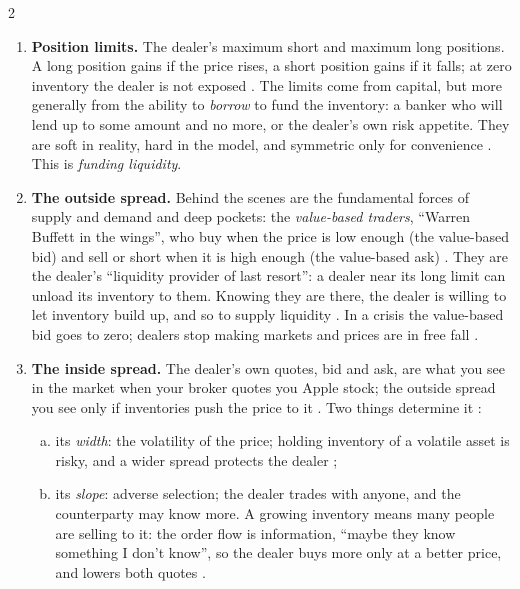 \begin{paracol}{2}
\begin{enumerate}
  \item \textbf{Position limits.} The dealer's maximum short and maximum long positions. A long position gains if the price rises, a short position gains if it falls; at zero
        inventory the dealer is not exposed . The limits come from capital, but more generally from the ability to \emph{borrow} to fund the inventory: a
        banker who will lend up to some amount and no more, or the dealer's own risk appetite. They are soft in reality, hard in the model, and symmetric only for convenience
        . This is \emph{funding liquidity}.
  \item \textbf{The outside spread.} Behind the scenes are the fundamental forces of supply and demand and deep pockets: the \emph{value-based traders}, ``Warren Buffett in the
        wings'', who buy when the price is low enough (the value-based bid) and sell or short when it is high enough (the value-based ask) . They are
        the dealer's ``liquidity provider of last resort'': a dealer near its long limit can unload its inventory to them. Knowing they are there, the dealer is willing to let
        inventory build up, and so to supply liquidity . In a crisis the value-based bid goes to zero; dealers stop making markets
        and prices are in free fall .
  \item \textbf{The inside spread.} The dealer's own quotes, bid and ask, are what you see in the market when your broker quotes you Apple stock; the outside spread you see only if
        inventories push the price to it . Two things determine it :
        \begin{enumerate}[(a)]
          \item its \emph{width}: the volatility of the price; holding inventory of a volatile asset is risky, and a wider spread protects the dealer ;
          \item its \emph{slope}: adverse selection; the dealer trades with anyone, and the counterparty may know more. A growing inventory means many people are selling to it: the
                order flow is information, ``maybe they know something I don't know'', so the dealer buys more only at a better price, and lowers both quotes
                .
        \end{enumerate}
\end{enumerate}


\end{paracol}
